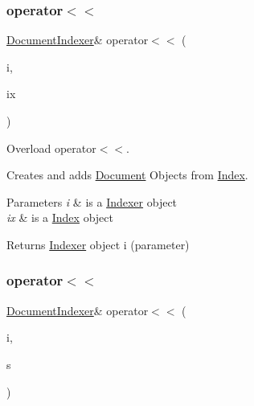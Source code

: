 \subsubsection{\texorpdfstring{operator$<$$<$}{operator<<}\hspace{0.1cm}{\footnotesize\ttfamily [2/4]}}
{\footnotesize\ttfamily \hyperlink{class_document_indexer}{Document\+Indexer}\& operator$<$$<$ (\begin{DoxyParamCaption}\item[{\hyperlink{class_document_indexer}{Document\+Indexer} \&}]{i,  }\item[{const \hyperlink{class_index}{Index} \&}]{ix }\end{DoxyParamCaption})\hspace{0.3cm}{\ttfamily [friend]}}



Overload operator$<$$<$. 

Creates and adds \hyperlink{class_document}{Document} Objects from \hyperlink{class_index}{Index}.


\begin{DoxyParams}{Parameters}
{\em i} & is a \hyperlink{class_indexer}{Indexer} object \\
\hline
{\em ix} & is a \hyperlink{class_index}{Index} object \\
\hline
\end{DoxyParams}
\begin{DoxyReturn}{Returns}
\hyperlink{class_indexer}{Indexer} object i (parameter) 
\end{DoxyReturn}
\mbox{\label{class_document_indexer_aadb77ccf09197d3adf55667f29672346}} 
\subsubsection{\texorpdfstring{operator$<$$<$}{operator<<}\hspace{0.1cm}{\footnotesize\ttfamily [3/4]}}
{\footnotesize\ttfamily \hyperlink{class_document_indexer}{Document\+Indexer}\& operator$<$$<$ (\begin{DoxyParamCaption}\item[{\hyperlink{class_document_indexer}{Document\+Indexer} \&}]{i,  }\item[{const \hyperlink{class_stopword}{Stopword} \&}]{s }\end{DoxyParamCaption})\hspace{0.3cm}{\ttfamily [friend]}}



